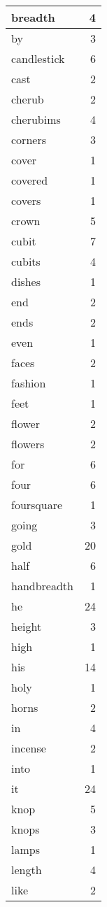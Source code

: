 \begin{center}
\begin{longtable}{l|r}
breadth & 4 \\ \hline
by & 3 \\ \hline
candlestick & 6 \\ \hline
cast & 2 \\ \hline
cherub & 2 \\ \hline
cherubims & 4 \\ \hline
corners & 3 \\ \hline
cover & 1 \\ \hline
covered & 1 \\ \hline
covers & 1 \\ \hline
crown & 5 \\ \hline
cubit & 7 \\ \hline
cubits & 4 \\ \hline
dishes & 1 \\ \hline
end & 2 \\ \hline
ends & 2 \\ \hline
even & 1 \\ \hline
faces & 2 \\ \hline
fashion & 1 \\ \hline
feet & 1 \\ \hline
flower & 2 \\ \hline
flowers & 2 \\ \hline
for & 6 \\ \hline
four & 6 \\ \hline
foursquare & 1 \\ \hline
going & 3 \\ \hline
gold & 20 \\ \hline
half & 6 \\ \hline
handbreadth & 1 \\ \hline
he & 24 \\ \hline
height & 3 \\ \hline
high & 1 \\ \hline
his & 14 \\ \hline
holy & 1 \\ \hline
horns & 2 \\ \hline
in & 4 \\ \hline
incense & 2 \\ \hline
into & 1 \\ \hline
it & 24 \\ \hline
knop & 5 \\ \hline
knops & 3 \\ \hline
lamps & 1 \\ \hline
length & 4 \\ \hline
like & 2 \\ \hline

\end{longtable}
\end{center}
